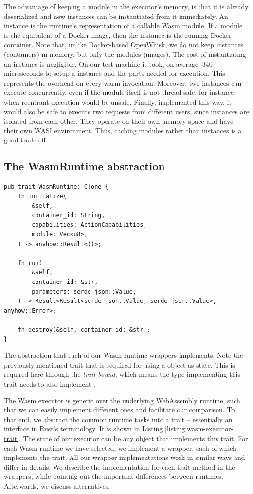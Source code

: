 The advantage of keeping a module in the executor's memory, is that it is already deserialized and new instances can be instantiated from it immediately. An instance is the runtime's representation of a callable Wasm module. If a module is the equivalent of a Docker image, then the instance is the running Docker container. Note that, unlike Docker-based OpenWhisk, we do not keep instances (containers) in-memory, but only the modules (images). The cost of instantiating an instance is negligible. On our test machine it took, on average, 340 microseconds to setup a  instance and the parts needed for execution. This represents the overhead on every warm invocation. Moreover, two instances can execute concurrently, even if the module itself is not thread-safe, for instance when reentrant execution would be unsafe. Finally, implemented this way, it would also be safe to execute two requests from different users, since instances are isolated from each other. They operate on their own memory space and have their own WASI environment. Thus, caching modules rather than instances is a good trade-off.

\subsection{The WasmRuntime abstraction}

\begin{listing}[ht]
    \begin{verbatim}
pub trait WasmRuntime: Clone {
    fn initialize(
        &self,
        container_id: String,
        capabilities: ActionCapabilities,
        module: Vec<u8>,
    ) -> anyhow::Result<()>;

    fn run(
        &self,
        container_id: &str,
        parameters: serde_json::Value,
    ) -> Result<Result<serde_json::Value, serde_json::Value>, anyhow::Error>;

    fn destroy(&self, container_id: &str);
}
\end{verbatim}
    \caption{The  abstraction that each of our Wasm runtime wrappers implements. Note the previously mentioned  trait that is required for using a  object as  state. This is required here through the \emph{trait bound}, which means the type implementing this trait needs to also implement .}
    \label{listing:wasm-executor-trait}
\end{listing}


The Wasm executor is generic over the underlying WebAssembly runtime, such that we can easily implement different ones and facilitate our comparison. To that end, we abstract the common runtime tasks into a trait -- essentially an interface in Rust's terminology. It is shown in Listing \ref{listing:wasm-executor-trait}. The state of our executor can be any object that implements this trait. For each Wasm runtime we have selected, we implement a wrapper, each of which implements the  trait. All our wrapper implementations work in similar ways and differ in details. We describe the implementation for each trait method in the wrappers, while pointing out the important differences between runtimes. Afterwards, we discuss alternatives.

